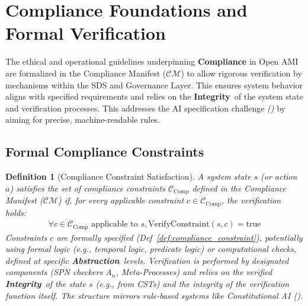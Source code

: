 \documentclass[12pt,a4paper]{report}
\renewcommand{\citep}[1]{\textit{\scriptsize{(\cite{#1})}}}
\newtheorem{definition}{Definition}[section]
\newcommand{\Integrity}{\textbf{Integrity}}
\newcommand{\Abstraction}{\textbf{Abstraction}}
\begin{document}
	\section{Compliance Foundations and Formal Verification}
	\label{sec:2-9}
	
	The ethical and operational guidelines underpinning \textbf{Compliance} in Open AMI are formalized in the Compliance Manifest ($\mathcal{CM}$) to allow rigorous verification by mechanisms within the SDS and Governance Layer. This ensures system behavior aligns with specified requirements and relies on the \Integrity\ of the system state and verification processes. This addresses the AI specification challenge \citep{Kovac2025SpecGaming} by aiming for precise, machine-readable rules.
	
	\subsection{Formal Compliance Constraints}
	\label{sec:2-9-1}
	
	\begin{definition}[Compliance Constraint Satisfaction]
		\label{def:compliance_satisfaction}
		A system state $s$ (or action $a$) satisfies the set of compliance constraints $\mathcal{C}_{\text{Comp}}$ defined in the Compliance Manifest ($\mathcal{CM}$) if, for every applicable constraint $c \in \mathcal{C}_{\text{Comp}}$, the verification holds:
		\begin{align}
			\forall c \in \mathcal{C}_{\text{Comp}} \text{ applicable to } s, \text{VerifyConstraint}(s, c) = \text{true}
		\end{align}
		Constraints $c$ are formally specified (Def~\ref{def:compliance_constraint}), potentially using formal logic (e.g., temporal logic, predicate logic) or computational checks, defined at specific \Abstraction\ levels. Verification is performed by designated components (SPN checkers $A_n$, Meta-Processes) and relies on the verified \Integrity\ of the state $s$ (e.g., from CSTs) and the integrity of the verification function itself. The structure mirrors rule-based systems like Constitutional AI \citep{Bai2022ConstitutionalAI}.
	\end{definition}
	
\end{document}
